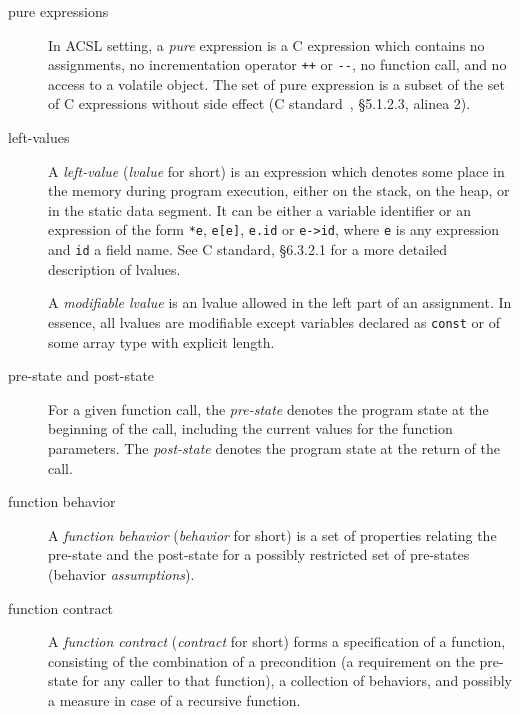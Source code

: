 \documentclass[a4paper,11pt,twoside,openright,web]{frama-c-book}
\begin{document}
\begin{description}
\item[pure expressions]  In ACSL setting, a
  \emph{pure} expression is a C expression which contains no assignments, no
  incrementation operator \lstinline|++| or \lstinline|--|, no function call,
  and no access to a volatile object. The set of pure expression is a
  subset of the set of C expressions without side effect (C
  standard~\cite{KR88,standardc99}, \S 5.1.2.3, alinea 2).

\item[left-values] 

  A \emph{left-value} (\emph{lvalue} for short) is an expression which
  denotes some place in the memory during program execution, either on
  the stack, on the heap, or in the static data segment. It can be
  either a variable identifier or an expression of the form \lstinline|*e|,
  \lstinline|e[e]|, \lstinline|e.id| or \lstinline|e->id|, where
  \lstinline |e| is any expression and \lstinline|id| a field name.
  See C standard, \S 6.3.2.1 for a more
  detailed description of lvalues.

  A \emph{modifiable lvalue} is an lvalue allowed in the left part of
  an assignment. In essence, all lvalues are modifiable except
  variables declared as \texttt{const} or of some array type with
  explicit length.



\item[pre-state and post-state]

    For a given function call, the \emph{pre-state} denotes the
    program state at the beginning of the call, including the
    current values for the function parameters. The \emph{post-state}
    denotes the program state at the return of the call.

\item[function behavior]  

  A \emph{function behavior} (\emph{behavior} for short) is a set of
  properties relating the pre-state and the post-state for a
  possibly restricted set of pre-states (behavior \emph{assumptions}).

\item[function contract]  

  A \emph{function contract} (\emph{contract} for short) forms a
  specification of a function, consisting of the combination of a
  precondition (a requirement on the pre-state for any caller to that
  function), a collection of behaviors, and possibly a measure in case
  of a recursive function.

\end{description}
\end{document}
